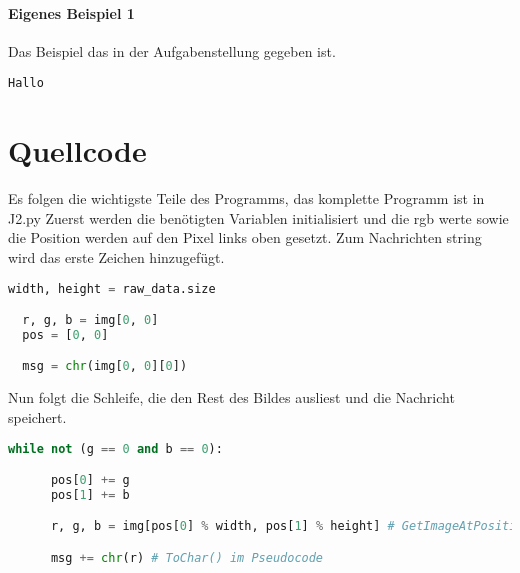 \documentclass[a4paper,10pt,ngerman]{scrartcl}
\begin{document}
\paragraph{Eigenes Beispiel 1}
Das Beispiel das in der Aufgabenstellung gegeben ist.
\begin{lstlisting}[frame=tb,breaklines=true]
Hallo
\end{lstlisting}


\section{Quellcode}
Es folgen die wichtigste Teile des Programms, das komplette Programm ist in J2.py
Zuerst werden die benötigten Variablen initialisiert und die rgb werte sowie die Position werden auf den Pixel links oben gesetzt.
Zum Nachrichten string wird das erste Zeichen hinzugefügt.
\begin{lstlisting}[language=Python]
  width, height = raw_data.size

  r, g, b = img[0, 0]
  pos = [0, 0]

  msg = chr(img[0, 0][0]) 
\end{lstlisting}
Nun folgt die Schleife, die den Rest des Bildes ausliest und die Nachricht speichert.
\begin{lstlisting}[language=Python]
  while not (g == 0 and b == 0):

      pos[0] += g
      pos[1] += b

      r, g, b = img[pos[0] % width, pos[1] % height] # GetImageAtPositionRGB() im Pseudocode

      msg += chr(r) # ToChar() im Pseudocode
\end{lstlisting}
\end{document}
